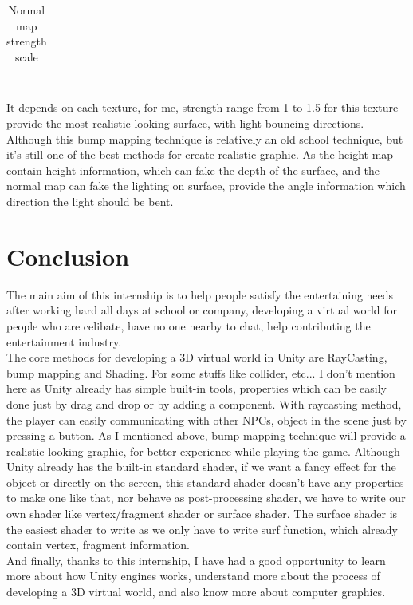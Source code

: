 \documentclass[a4paper, 13pt]{extarticle}
\begin{document}
{\begin{table}[h]
\begin{tabular}{|M{2.5cm}|M{4cm}|M{4cm}|}
 		\end{tabular}
 		\newline\newline
 		\caption{Normal map strength scale}\label{tab1}
 	\end{table} \\
 	It depends on each texture, for me, strength range from 1 to 1.5 for this texture provide the most realistic looking surface, with light bouncing directions. Although this bump mapping technique is relatively an old school technique, but it's still one of the best methods for create realistic graphic. As the height map contain height information, which can fake the depth of the surface, and the normal map can fake the lighting on surface, provide the angle information which direction the light should be bent. 
 	 
 	\section{Conclusion}  
 	The main aim of this internship is to help people satisfy the entertaining needs after working hard all days at school or company, developing a virtual world for people who are celibate, have no one nearby to chat, help contributing the entertainment industry. \\ The core methods for developing a 3D virtual world in Unity are RayCasting, bump mapping and Shading. For some stuffs like collider, etc... I don't mention here as Unity already has simple built-in tools, properties which can be easily done just by drag and drop or by adding a component. With raycasting method, the player can easily communicating with other NPCs, object in the scene just by pressing a button. As I mentioned above, bump mapping technique will provide a realistic looking graphic, for better experience while playing the game. Although Unity already has the built-in standard shader, if we want a fancy effect for the object or directly on the screen, this standard shader doesn't have any properties to make one like that, nor behave as post-processing shader, we have to write our own shader like vertex/fragment shader or surface shader. The surface shader is the easiest shader to write as we only have to write surf function, which already contain vertex, fragment information. \\ And finally, thanks to this internship, I have had a good opportunity to learn more about how Unity engines works, understand more about the process of developing a 3D virtual world, and also know more about computer graphics.   
}
\end{document}
